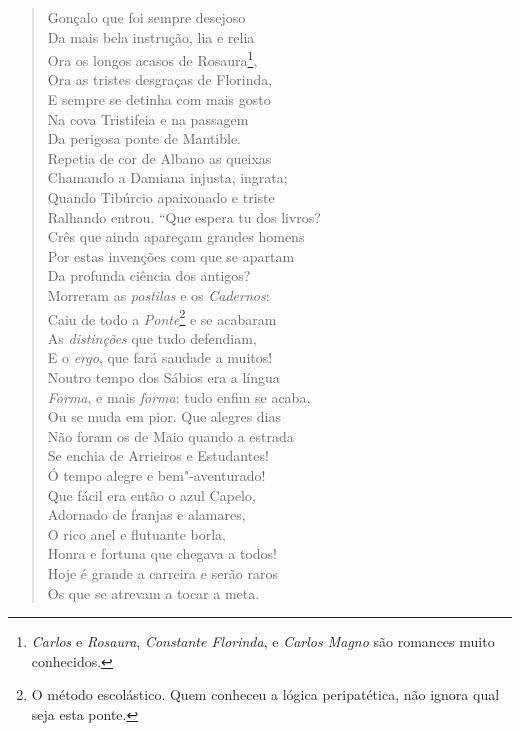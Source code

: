 \begin{verse}
Gonçalo que foi sempre desejoso\\
Da mais bela instrução, lia e relia\\
Ora os longos acasos de Rosaura\footnote{ \textit{Carlos} e
\textit{Rosaura}, \textit{Constante Florinda}, e \textit{Carlos Magno} são
romances muito conhecidos.},\\ 
Ora as tristes desgraças de Florinda,\\ 	\index{\Romvulg}
E sempre se detinha com mais gosto\\
Na cova Tristifeia e na passagem\\
Da perigosa ponte de Mantible.\\
Repetia de cor de Albano as queixas\\
Chamando a Damiana injusta, ingrata;\\
Quando Tibúrcio apaixonado e triste\\
Ralhando entrou. ``Que espera tu dos livros?\\
Crês que ainda apareçam grandes homens\\
Por estas invenções com que se apartam\\
Da profunda ciência dos antigos?\\
Morreram as \textit{postilas} e os \textit{Cadernos}:\\
Caiu de todo a \textit{Ponte}\footnote{ O método escolástico. Quem
conheceu a lógica peripatética, não ignora qual seja esta ponte.} e se acabaram\\		\index{\Perip}
As \textit{distinções} que tudo defendiam,\\
E o \textit{ergo}, que fará saudade a muitos!\\
Noutro tempo dos Sábios era a língua\\
\textit{Forma}, e mais \textit{forma}: tudo enfim se acaba,\\
Ou se muda em pior. Que alegres dias\\
Não foram os de Maio quando a estrada\\
Se enchia de Arrieiros e Estudantes!\\
Ó tempo alegre e bem"-aventurado!\\
Que fácil era então o azul Capelo,\\
Adornado de franjas e alamares,\\
O rico anel e flutuante borla,\\
Honra e fortuna que chegava a todos!\\
Hoje é grande a carreira e serão raros\\
Os que se atrevam a tocar a meta.\\

\end{verse}
